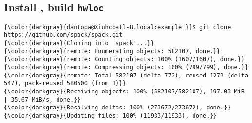 \documentclass[10pt, oneside]{article}   	%
\begin{document}
\subsection{Install \spack, build \texttt{hwloc}}
{\scriptsize{
\begin{Verbatim}[commandchars=\\\{\}]
{\color{darkgray}{dantopa@Xiuhcoatl-8.local:example }}$ git clone https://github.com/spack/spack.git
{\color{darkgray}{Cloning into 'spack'...}}
{\color{darkgray}{remote: Enumerating objects: 582107, done.}}
{\color{darkgray}{remote: Counting objects: 100% (1607/1607), done.}}
{\color{darkgray}{remote: Compressing objects: 100% (799/799), done.}}
{\color{darkgray}{remote: Total 582107 (delta 772), reused 1273 (delta 547), pack-reused 580500 (from 1)}}
{\color{darkgray}{Receiving objects: 100% (582107/582107), 197.03 MiB | 35.67 MiB/s, done.}}
{\color{darkgray}{Resolving deltas: 100% (273672/273672), done.}}
{\color{darkgray}{Updating files: 100% (11933/11933), done.}}


\end{Verbatim}}}
\end{document}
